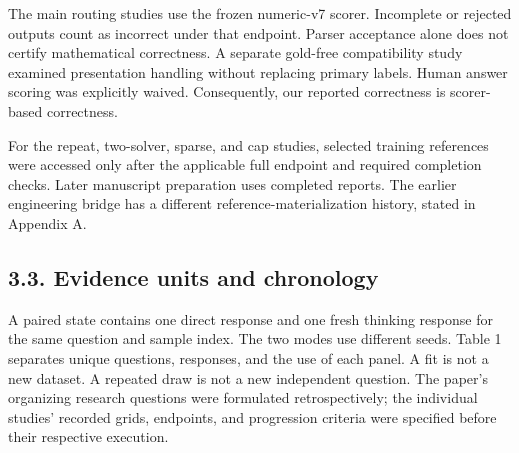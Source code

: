 \documentclass[11pt,a4paper]{article}
\begin{document}
The main routing studies use the frozen numeric-v7 scorer. Incomplete or rejected outputs count as incorrect under that endpoint. Parser acceptance alone does not certify mathematical correctness. A separate gold-free compatibility study examined presentation handling without replacing primary labels. Human answer scoring was explicitly waived. Consequently, our reported correctness is scorer-based correctness.

For the repeat, two-solver, sparse, and cap studies, selected training references were accessed only after the applicable full endpoint and required completion checks. Later manuscript preparation uses completed reports. The earlier engineering bridge has a different reference-materialization history, stated in Appendix A.

\subsection*{3.3. Evidence units and chronology}\label{sec:33-evidence-units-and-chronology}
A paired state contains one direct response and one fresh thinking response for the same question and sample index. The two modes use different seeds. Table 1 separates unique questions, responses, and the use of each panel. A fit is not a new dataset. A repeated draw is not a new independent question. The paper's organizing research questions were formulated retrospectively; the individual studies' recorded grids, endpoints, and progression criteria were specified before their respective execution.
\end{document}
